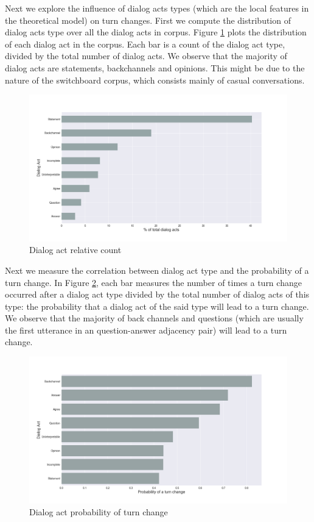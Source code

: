 Next we explore the influence of dialog acts types (which are the local features in the theoretical model) on turn changes.
First we compute the distribution of dialog acts type over all the dialog acts in corpus.
Figure \ref{fig:act} plots the distribution of each dialog act in the corpus. Each bar is a count of the dialog act type, divided by the total number of dialog acts.  We observe that the majority of dialog acts are statements, backchannels and opinions. This might be due to the nature of the switchboard corpus, which consists mainly of casual conversations.
%
\begin{figure}[ht!]
 \centering
 \includegraphics[width=\textwidth]{../scikitlearn/figures/f1.png}\vspace{-1em}
 \caption{Dialog act relative count}
 \label{fig:act}
 \end{figure}

Next we measure the correlation between dialog act type and the probability of a turn change.  In Figure \ref{fig:act:turnchange}, each bar measures the number of times a turn change occurred after a dialog act type divided by the total number of dialog acts of this type: the probability that a dialog act of the said type will lead to a turn change. We observe that the majority of back channels and questions (which are usually the first utterance in an question-answer adjacency pair) will lead to a turn change.
%
\begin{figure}[ht!]
\centering
\includegraphics[width=\textwidth]{../scikitlearn/figures/f2.png}\vspace{-1em}
\caption{Dialog act probability of turn change}
\label{fig:act:turnchange}
\end{figure}

